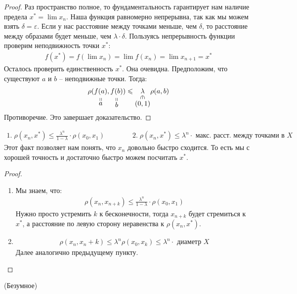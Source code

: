 \begin{proof}
    Раз пространство полное, то фундаментальность гарантирует нам наличие предела $x^* = \lim{x_n}$.
    Наша функция равномерно непрерывна, так как мы можем взять $\delta = \varepsilon$. Если у нас расстояние 
    между точками меньше, чем $\delta$, то расстояние между образами будет меньше, чем $\lambda \cdot \delta$. 
    Пользуясь непрерывность функции проверим неподвижность точки $x^*$:
    \begin{gather*}
        f(x^*) = f(\lim{x_n}) = \lim{f(x_n)} = \lim{x_{n+1}} = x^*
    \end{gather*}
    Осталось проверить единственность $x^*$. Она очевидна. Предположим, что существуют $a$ и $b$ -- неподвижные точки. Тогда:
    \begin{gather*}
        \rho(\stackbelow{f(a)}{a}, \stackbelow{f(b)}{b}) \leqslant \inbelow{\lambda}{(0, 1)} \rho(a, b)
    \end{gather*}
    Противоречие. Это завершает доказательство.
\end{proof}
\notice
\begin{gather*}
    1. \; \rho(x_n, x^*) \leqslant \frac{\lambda^n}{1 - \lambda} \cdot \rho(x_0, x_1) \qquad \qquad 
    2. \; \rho(x_n, x^*) \leqslant \lambda^n \cdot \text{ макс. расст. между точками в } X
\end{gather*} 
Этот факт позволяет нам понять, что $x_n$ довольно быстро сходится. То есть мы с хорошей точность и достаточно быстро можем посчитать $x^*$. 
\begin{proof} \quad 

    \begin{enumerate}
        \item Мы знаем, что:
        \begin{gather*}
            \rho(x_n, x_{n+k}) \leqslant \frac{\lambda^n}{1 - \lambda} \cdot \rho(x_0, x_1)
        \end{gather*}
        Нужно просто устремить $k$ к бесконечности, тогда $x_{n+k}$ будет стремиться к $x^*$, а расстояние по левую сторону неравенства к $\rho(x_n, x^*)$.
        \item \begin{gather*}
            \rho(x_n, x_n+k) \leqslant \lambda^n \rho(x_0, x_k) \leqslant \lambda^n \cdot \text{ диаметр } X
        \end{gather*}
        Далее аналогично предыдущему пункту.
    \end{enumerate}
\end{proof}
\follow \; (Безумное)

